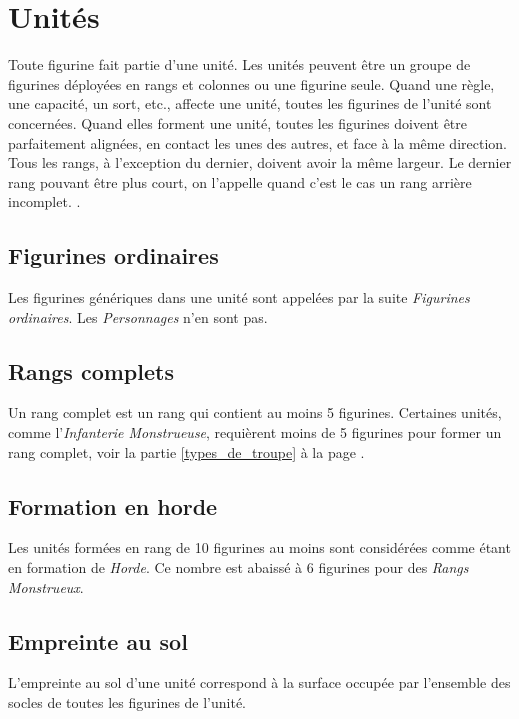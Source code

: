 \section{Unités}

Toute figurine fait partie d'une unité. Les unités peuvent être un groupe de figurines déployées en rangs et colonnes ou une figurine seule. Quand une règle, une capacité, un sort, etc., affecte une unité, toutes les figurines de l'unité sont concernées. Quand elles forment une unité, toutes les figurines doivent être parfaitement alignées, en contact les unes des autres, et face à la même direction. Tous les rangs, à l'exception du dernier, doivent avoir la même largeur. Le dernier rang pouvant être plus court, on l'appelle quand c'est le cas un rang arrière incomplet. . 

\subsection{Figurines ordinaires}

Les figurines génériques dans une unité sont appelées par la suite \emph{Figurines ordinaires}. Les \emph{Personnages} n'en sont pas.

\subsection{Rangs complets}

Un rang complet est un rang qui contient au moins 5 figurines. Certaines unités, comme l'\emph{Infanterie Monstrueuse}, requièrent moins de 5 figurines pour former un rang complet, voir la partie \ref{types_de_troupe} à la page \pageref{types_de_troupe}.

\subsection{Formation en horde}
\label{horde}

Les unités formées en rang de 10 figurines au moins sont considérées comme étant en formation de \emph{Horde}. Ce nombre est abaissé à 6 figurines pour des \emph{Rangs Monstrueux}.

\subsection{Empreinte au sol}

L'empreinte au sol d'une unité correspond à la surface occupée par l'ensemble des socles de toutes les figurines de l'unité.


